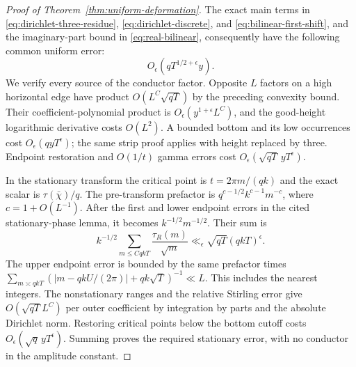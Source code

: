 \begin{proof}[Proof of Theorem~\ref{thm:uniform-deformation}]
The exact main terms in \eqref{eq:dirichlet-three-residue},
\eqref{eq:dirichlet-discrete}, and \eqref{eq:bilinear-first-shift},
and the imaginary-part bound in \eqref{eq:real-bilinear}, consequently
have the following common uniform error:
\begin{equation}\label{eq:uniform-moment-error-new}
                         O_\epsilon(qT^{1/2+\epsilon}y).
\end{equation}
We verify every source of the conductor factor. Opposite $L$ factors
on a high horizontal edge have product $O(L^C\sqrt{qT})$ by the
preceding convexity bound. Their coefficient-polynomial product is
$O_\epsilon(y^{1+\epsilon}L^C)$, and the good-height logarithmic
derivative costs $O(L^2)$. A bounded bottom and its low occurrences
cost $O_\epsilon(qyT^\epsilon)$; the same strip proof applies with
height replaced by three. Endpoint restoration and $O(1/t)$ gamma
errors cost $O_\epsilon(\sqrt{qT}\,yT^\epsilon)$.

In the stationary transform the critical point is
$t=2\pi m/(qk)$ and the exact scalar is $\tau(\bar\chi)/q$.
The pre-transform prefactor is $q^{c-1/2}k^{c-1}m^{-c}$,
where $c=1+O(L^{-1})$. After the first and lower endpoint errors in
the cited stationary-phase lemma, it becomes $k^{-1/2}m^{-1/2}$.
Their sum is
\[
 k^{-1/2}\sum_{m\le CqkT}\frac{\tau_R(m)}{\sqrt m}
                    \ll_\epsilon\sqrt{qT}(qkT)^\epsilon.
\]
The upper endpoint error is bounded by the same prefactor times
$\sum_{m\asymp qkT}(|m-qkU/(2\pi)|+qk\sqrt T)^{-1}\ll L$.
This includes the nearest integers. The nonstationary ranges and
the relative Stirling error give $O(\sqrt{qT}L^C)$ per outer
coefficient by integration by parts and the absolute Dirichlet norm.
Restoring critical points below the bottom cutoff costs
$O_\epsilon(\sqrt q\,yT^\epsilon)$. Summing proves the required
stationary error, with no conductor in the amplitude constant.


\end{proof}
